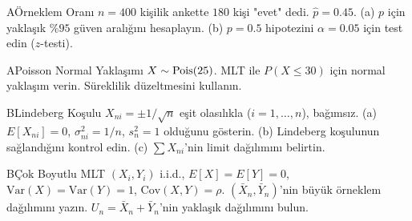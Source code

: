 
\alistirmalar

\begin{alistirma}[Al.8.5]{A}{Örneklem Oranı}
$n=400$ kişilik ankette $180$ kişi "evet" dedi. $\hat{p}=0.45$.
(a) $p$ için yaklaşık $\%95$ güven aralığını hesaplayın.
(b) $p=0.5$ hipotezini $\alpha=0.05$ için test edin ($z$-testi).
\end{alistirma}

\begin{alistirma}[Al.8.6]{A}{Poisson Normal Yaklaşımı}
$X \sim \operatorname{Pois}(25)$. MLT ile $P(X \leq 30)$ için normal yaklaşım verin.
Süreklilik düzeltmesini kullanın.
\end{alistirma}

\begin{alistirma}[Al.8.7]{B}{Lindeberg Koşulu}
$X_{ni} = \pm 1/\sqrt{n}$ eşit olasılıkla ($i = 1,\ldots,n$), bağımsız.
(a) $E[X_{ni}]=0$, $\sigma_{ni}^2=1/n$, $s_n^2=1$ olduğunu gösterin.
(b) Lindeberg koşulunun sağlandığını kontrol edin.
(c) $\sum X_{ni}$'nin limit dağılımını belirtin.
\end{alistirma}

\begin{alistirma}[Al.8.8]{B}{Çok Boyutlu MLT}
$(X_i, Y_i)$ i.i.d., $E[X]=E[Y]=0$, $\mathrm{Var}(X)=\mathrm{Var}(Y)=1$, $\mathrm{Cov}(X,Y)=\rho$.
$(\bar{X}_n, \bar{Y}_n)$'nin büyük örneklem dağılımını yazın.
$U_n = \bar{X}_n + \bar{Y}_n$'nin yaklaşık dağılımını bulun.
\end{alistirma}

